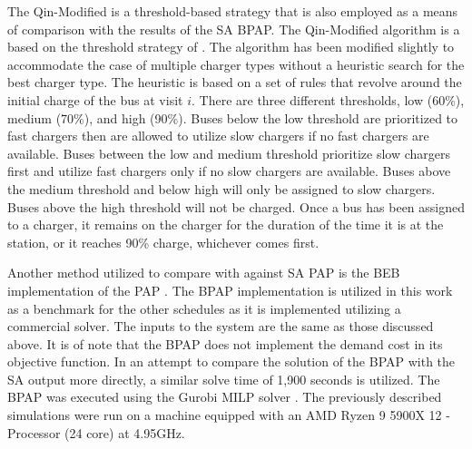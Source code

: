 \documentclass[ee,thesis]{usuthesis}
\begin{document}
The Qin-Modified is a threshold-based strategy that is also employed as a means of comparison with the results of the SA
BPAP. The Qin-Modified algorithm is a based on the threshold strategy of \cite{qin-2016-numer-analy}. The algorithm has
been modified slightly to accommodate the case of multiple charger types without a heuristic search for the best charger
type. The heuristic is based on a set of rules that revolve around the initial charge of the bus at visit \(i\). There are
three different thresholds, low (60\%), medium (70\%), and high (90\%). Buses below the low threshold are prioritized to
fast chargers then are allowed to utilize slow chargers if no fast chargers are available. Buses between the low and
medium threshold prioritize slow chargers first and utilize fast chargers only if no slow chargers are available. Buses
above the medium threshold and below high will only be assigned to slow chargers. Buses above the high threshold will
not be charged. Once a bus has been assigned to a charger, it remains on the charger for the duration of the time it is
at the station, or it reaches 90\% charge, whichever comes first.

Another method utilized to compare with against SA PAP is the BEB implementation of the PAP
\cite{brown-2024-posit-alloc}. The BPAP implementation is utilized in this work as a benchmark for the other schedules
as it is implemented utilizing a commercial solver. The inputs to the system are the same as those discussed above. It
is of note that the BPAP does not implement the demand cost in its objective function. In an attempt to compare the
solution of the BPAP with the SA output more directly, a similar solve time of 1,900 seconds is utilized. The BPAP was
executed using the Gurobi MILP solver \cite{gurobi-2021-gurob-optim}. The previously described simulations were run on
a machine equipped with an AMD Ryzen 9 5900X 12 - Processor (24 core) at 4.95GHz.
\end{document}
